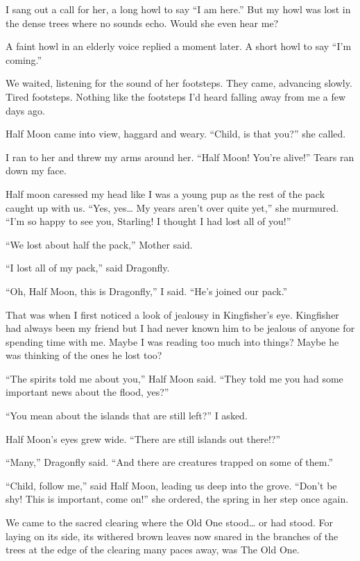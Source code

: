 I sang out a call for her, a long howl to say ``I am here.'' But my howl was lost in the dense trees where no sounds echo. Would she even hear me?

A faint howl in an elderly voice replied a moment later. A short howl to say ``I'm coming.''

We waited, listening for the sound of her footsteps. They came, advancing slowly. Tired footsteps. Nothing like the footsteps I'd heard falling away from me a few days ago.

Half Moon came into view, haggard and weary. ``Child, is that you?'' she called.

I ran to her and threw my arms around her. ``Half Moon! You're alive!'' Tears ran down my face.

Half moon caressed my head like I was a young pup as the rest of the pack caught up with us. ``Yes, yes\ldots{} My years aren't over quite yet,'' she murmured. ``I'm so happy to see you, Starling! I thought I had lost all of you!''

``We lost about half the pack,'' Mother said.

``I lost all of my pack,'' said Dragonfly.

``Oh, Half Moon, this is Dragonfly,'' I said. ``He's joined our pack.''

That was when I first noticed a look of jealousy in Kingfisher's eye. Kingfisher had always been my friend but I had never known him to be jealous of anyone for spending time with me. Maybe I was reading too much into things? Maybe he was thinking of the ones he lost too?

``The spirits told me about you,'' Half Moon said. ``They told me you had some important news about the flood, yes?''

``You mean about the islands that are still left?'' I asked.

Half Moon's eyes grew wide. ``There are still islands out there!?''

``Many,'' Dragonfly said. ``And there are creatures trapped on some of them.''

``Child, follow me,'' said Half Moon, leading us deep into the grove. ``Don't be shy! This is important, come on!'' she ordered, the spring in her step once again.

We came to the sacred clearing where the Old One stood\ldots{} or had stood. For laying on its side, its withered brown leaves now snared in the branches of the trees at the edge of the clearing many paces away, was The Old One.

